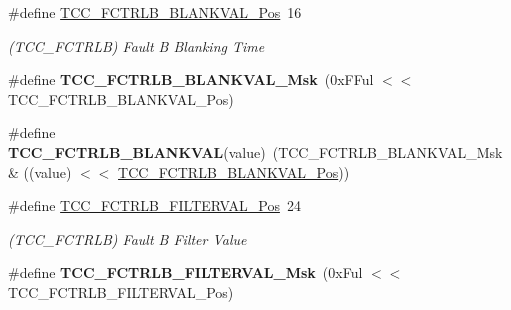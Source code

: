 \begin{DoxyCompactItemize}
\item 
\hypertarget{group___s_a_m_l21___t_c_c_ga05db4fa9bf36fdd152b8ded2b1f5fd5c}{}\#define \hyperlink{group___s_a_m_l21___t_c_c_ga05db4fa9bf36fdd152b8ded2b1f5fd5c}{T\+C\+C\+\_\+\+F\+C\+T\+R\+L\+B\+\_\+\+B\+L\+A\+N\+K\+V\+A\+L\+\_\+\+Pos}~16\label{group___s_a_m_l21___t_c_c_ga05db4fa9bf36fdd152b8ded2b1f5fd5c}

\begin{DoxyCompactList}\small\item\em (T\+C\+C\+\_\+\+F\+C\+T\+R\+L\+B) Fault B Blanking Time \end{DoxyCompactList}\item 
\hypertarget{group___s_a_m_l21___t_c_c_gaf1b5d4f4eeae9e2aba9d2704c9ec1d0b}{}\#define {\bfseries T\+C\+C\+\_\+\+F\+C\+T\+R\+L\+B\+\_\+\+B\+L\+A\+N\+K\+V\+A\+L\+\_\+\+Msk}~(0x\+F\+Ful $<$$<$ T\+C\+C\+\_\+\+F\+C\+T\+R\+L\+B\+\_\+\+B\+L\+A\+N\+K\+V\+A\+L\+\_\+\+Pos)\label{group___s_a_m_l21___t_c_c_gaf1b5d4f4eeae9e2aba9d2704c9ec1d0b}

\item 
\hypertarget{group___s_a_m_l21___t_c_c_gaef118dce3a289ff3f5b115ac817e8040}{}\#define {\bfseries T\+C\+C\+\_\+\+F\+C\+T\+R\+L\+B\+\_\+\+B\+L\+A\+N\+K\+V\+A\+L}(value)~(T\+C\+C\+\_\+\+F\+C\+T\+R\+L\+B\+\_\+\+B\+L\+A\+N\+K\+V\+A\+L\+\_\+\+Msk \& ((value) $<$$<$ \hyperlink{group___s_a_m_l21___t_c_c_ga05db4fa9bf36fdd152b8ded2b1f5fd5c}{T\+C\+C\+\_\+\+F\+C\+T\+R\+L\+B\+\_\+\+B\+L\+A\+N\+K\+V\+A\+L\+\_\+\+Pos}))\label{group___s_a_m_l21___t_c_c_gaef118dce3a289ff3f5b115ac817e8040}

\item 
\hypertarget{group___s_a_m_l21___t_c_c_gaf826336f218fb5af54f6233ddae07dc6}{}\#define \hyperlink{group___s_a_m_l21___t_c_c_gaf826336f218fb5af54f6233ddae07dc6}{T\+C\+C\+\_\+\+F\+C\+T\+R\+L\+B\+\_\+\+F\+I\+L\+T\+E\+R\+V\+A\+L\+\_\+\+Pos}~24\label{group___s_a_m_l21___t_c_c_gaf826336f218fb5af54f6233ddae07dc6}

\begin{DoxyCompactList}\small\item\em (T\+C\+C\+\_\+\+F\+C\+T\+R\+L\+B) Fault B Filter Value \end{DoxyCompactList}\item 
\hypertarget{group___s_a_m_l21___t_c_c_gad7d043fb75fbb282856d0110f1701727}{}\#define {\bfseries T\+C\+C\+\_\+\+F\+C\+T\+R\+L\+B\+\_\+\+F\+I\+L\+T\+E\+R\+V\+A\+L\+\_\+\+Msk}~(0x\+Ful $<$$<$ T\+C\+C\+\_\+\+F\+C\+T\+R\+L\+B\+\_\+\+F\+I\+L\+T\+E\+R\+V\+A\+L\+\_\+\+Pos)\label{group___s_a_m_l21___t_c_c_gad7d043fb75fbb282856d0110f1701727}


\end{DoxyCompactItemize}
